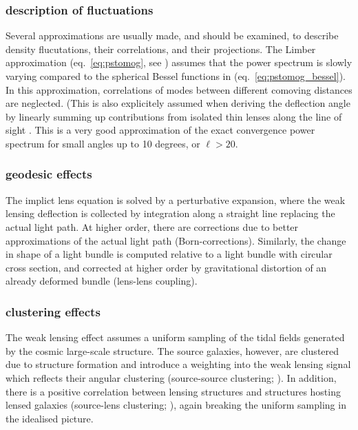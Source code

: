 \subsubsection{description of fluctuations}

Several approximations are usually made, and should be examined, to describe
density flucutations, their correlations, and their projections. The Limber
approximation (eq.~\ref{eq:pstomog}, see
\cite{1953ApJ...117..134L,1992ApJ...388..272K}) assumes that the power spectrum
is slowly varying compared to the spherical Bessel functions in
(eq.~\ref{eq:pstomog_bessel}). In this approximation, correlations of modes
between different comoving distances are neglected. (This is also explicitely
assumed when deriving the deflection angle by linearly summing up
contributions from isolated thin lenses along the line of sight
\cite{1994CQGra..11.2345S}. This is a very good approximation of the exact convergence
power spectrum for small angles up to 10 degrees, or $\ell > 20$.

\subsubsection{geodesic effects}

The implict lens equation is solved by a perturbative expansion, where the weak
lensing deflection is collected by integration along a straight line replacing
the actual light path. At higher order, there are corrections due to better
approximations of the actual light path (Born-corrections). Similarly, the
change in shape of a light bundle is computed relative to a light bundle with
circular cross section, and corrected at higher order by gravitational
distortion of an already deformed bundle (lens-lens coupling).


\subsubsection{clustering effects}
The weak lensing effect assumes a uniform sampling of the tidal fields generated by the cosmic large-scale structure. The source galaxies, however, are clustered due to structure formation and introduce a weighting into the weak lensing  signal which reflects their angular clustering (source-source clustering; \cite{2002A&A...389..729S}). In addition, there is a positive correlation between lensing structures and structures hosting lensed galaxies (source-lens clustering; \cite{1998A&A...338..375B}), again breaking the uniform sampling in the idealised picture.


